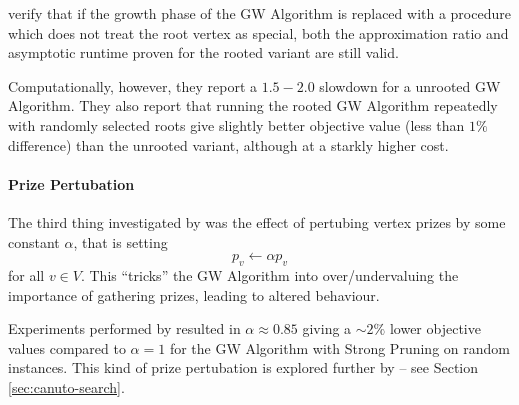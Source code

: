 \citet{Johnson:2000:PCS:338219.338637} verify that if the growth phase of the GW Algorithm
is replaced with a procedure which does not treat the root vertex as special, both the
approximation ratio and asymptotic runtime proven for the rooted variant are still valid.

Computationally, however, they report a $1.5-2.0$ slowdown for a unrooted GW Algorithm. They also
report that running the rooted GW Algorithm repeatedly with randomly selected roots give slightly
better objective value (less than $1\%$ difference) than the unrooted variant, although at a starkly
higher cost.
\paragraph{Prize Pertubation} The third thing investigated by \citet{Johnson:2000:PCS:338219.338637} was
the effect of pertubing vertex prizes by some constant $\alpha$, that is setting
\[p_v \gets \alpha p_v\]
for all $v \in V$. This ``tricks'' the GW Algorithm into over/undervaluing the importance of gathering prizes,
 leading to altered behaviour.

 Experiments performed by \citeauthor{Johnson:2000:PCS:338219.338637} resulted in $\alpha \approx 0.85$ giving a $\sim2\%$
 lower objective values compared to $\alpha = 1$ for the GW Algorithm with Strong Pruning on random instances.
  This kind of prize pertubation is explored further by \citet{canuto2001local} -- see Section \ref{sec:canuto-search}.


